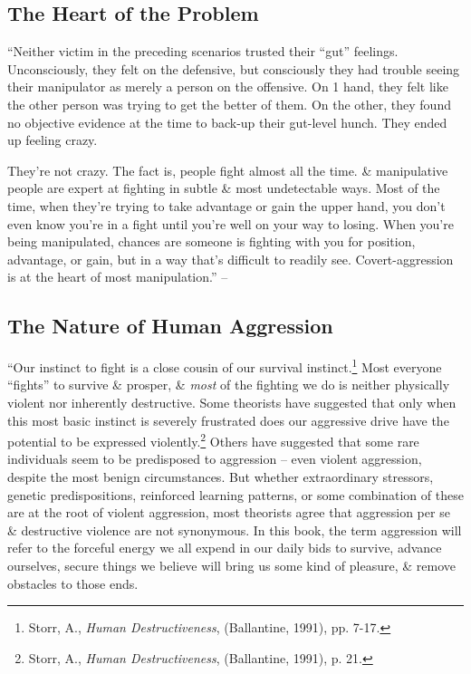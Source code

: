 \documentclass{article}
\numberwithin{equation}{section}
\begin{document}
\subsection{The Heart of the Problem}
``Neither victim in the preceding scenarios trusted their ``gut'' feelings. Unconsciously, they felt on the defensive, but consciously they had trouble seeing their manipulator as merely a person on the offensive. On 1 hand, they felt like the other person was trying to get the better of them. On the other, they found no objective evidence at the time to back-up their gut-level hunch. They ended up feeling crazy.

They're not crazy. The fact is, people fight almost all the time. \& manipulative people are expert at fighting in subtle \& most undetectable ways. Most of the time, when they're trying to take advantage or gain the upper hand, you don't even know you're in a fight until you're well on your way to losing. When you're being manipulated, chances are someone is fighting with you for position, advantage, or gain, but in a way that's difficult to readily see. Covert-aggression is at the heart of most manipulation.'' -- \cite[p. 18]{Simon2010}

\subsection{The Nature of Human Aggression}
``Our instinct to fight is a close cousin of our survival instinct.\footnote{Storr, A., \textit{Human Destructiveness}, (Ballantine, 1991), pp. 7-17.} Most everyone ``fights'' to survive \& prosper, \& \textit{most} of the fighting we do is neither physically violent nor inherently destructive. Some theorists have suggested that only when this most basic instinct is severely frustrated does our aggressive drive have the potential to be expressed violently.\footnote{Storr, A., \textit{Human Destructiveness}, (Ballantine, 1991), p. 21.} Others have suggested that some rare individuals seem to be predisposed to aggression -- even violent aggression, despite the most benign circumstances. But whether extraordinary stressors, genetic predispositions, reinforced learning patterns, or some combination of these are at the root of violent aggression, most theorists agree that aggression per se \& destructive violence are not synonymous. In this book, the term aggression will refer to the forceful energy we all expend in our daily bids to survive, advance ourselves, secure things we believe will bring us some kind of pleasure, \& remove obstacles to those ends.
\end{document}
